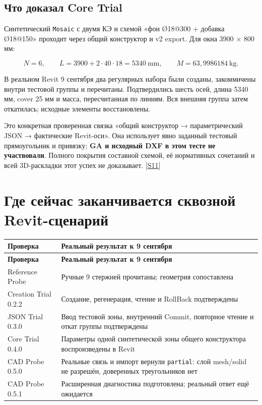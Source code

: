 \documentclass[11pt,a4paper]{article}
\begin{document}
\subsection{Что доказал Core Trial}

Синтетический {\small\nolinkurl{Mosaic}} с двумя КЭ и схемой «фон Ø18@300 + добавка Ø18@150» проходит через общий конструктор и v2 export. Для окна 3900 × 800 мм:


\[
N=6,\qquad L=3900+2\cdot40\cdot18=5340\ \mathrm{mm},
\qquad M=63{,}9986184\ \mathrm{kg}.
\]

В реальном Revit 9 сентября два регулярных набора были созданы, закоммичены внутри тестовой группы и перечитаны. Подтвердились шесть осей, длина 5340 мм, cover 25 мм и масса, пересчитанная по линиям. Вся внешняя группа затем откатилась; исходные элементы восстановлены.


Это конкретная проверенная связка «общий конструктор → параметрический JSON → фактические Revit-оси». Она использует явно заданный тестовый прямоугольник и привязку; \textbf{GA и исходный DXF в этом тесте не участвовали}. Полного покрытия составной схемой, её нормативных сочетаний и всей 3D-раскладки этот успех не доказывает. {\color{Teal}\small[\hyperlink{S11}{S11}]}


\section{Где сейчас заканчивается сквозной Revit-сценарий}

{\small\setlength{\tabcolsep}{4pt}
\begin{longtable}{@{}L{54.804mm}L{106.384mm}@{}}
\toprule
\textbf{Проверка} & \textbf{Реальный результат к 9 сентября} \\
\midrule\endfirsthead
\toprule
\textbf{Проверка} & \textbf{Реальный результат к 9 сентября} \\
\midrule\endhead
\bottomrule\endfoot
Reference Probe & Ручные 9 стержней прочитаны; геометрия сопоставлена \\
Creation Trial 0.2.2 & Создание, регенерация, чтение и RollBack подтверждены \\
JSON Trial 0.3.0 & Ввод тестовой зоны, внутренний Commit, повторное чтение и откат группы подтверждены \\
Core Trial 0.4.0 & Параметры одной синтетической зоны общего конструктора воспроизведены в Revit \\
CAD Probe 0.5.0 & Реальные связь и импорт вернули {\small\nolinkurl{partial}}: слой mesh/solid не разрешён, доверенных треугольников нет \\
CAD Probe 0.5.1 & Расширенная диагностика подготовлена; реальный ответ ещё ожидается \\
\end{longtable}}
\end{document}
